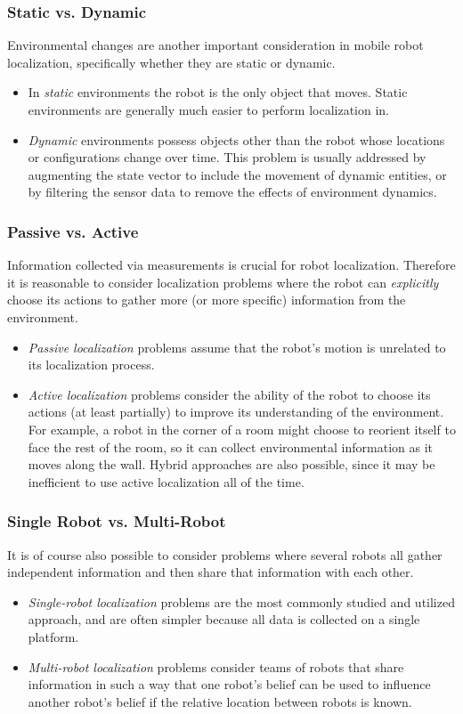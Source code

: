 \subsubsection{Static vs. Dynamic}
Environmental changes are another important consideration in mobile robot localization, specifically whether they are static or dynamic.
\begin{itemize}
    \item In \textit{static} environments the robot is the only object that moves. Static environments are generally much easier to perform localization in.
    \item \textit{Dynamic} environments possess objects other than the robot whose locations or configurations change over time. This problem is usually addressed by augmenting the state vector to include the movement of dynamic entities, or by filtering the sensor data to remove the effects of environment dynamics.
\end{itemize}

\subsubsection{Passive vs. Active}
Information collected via measurements is crucial for robot localization. Therefore it is reasonable to consider localization problems where the robot can \textit{explicitly} choose its actions to gather more (or more specific) information from the environment. 
\begin{itemize}
    \item \textit{Passive localization} problems assume that the robot's motion is unrelated to its localization process.
    \item \textit{Active localization} problems consider the ability of the robot to choose its actions (at least partially) to improve its understanding of the environment. For example, a robot in the corner of a room might choose to reorient itself to face the rest of the room, so it can collect environmental information as it moves along the wall. Hybrid approaches are also possible, since it may be inefficient to use active localization all of the time. 
\end{itemize}

\subsubsection{Single Robot vs. Multi-Robot}
It is of course also possible to consider problems where several robots all gather independent information and then share that information with each other.
\begin{itemize}
    \item \textit{Single-robot localization} problems are the most commonly studied and utilized approach, and are often simpler because all data is collected on a single platform.
    \item \textit{Multi-robot localization} problems consider teams of robots that share information in such a way that one robot's belief can be used to influence another robot's belief if the relative location between robots is known. 
\end{itemize}


